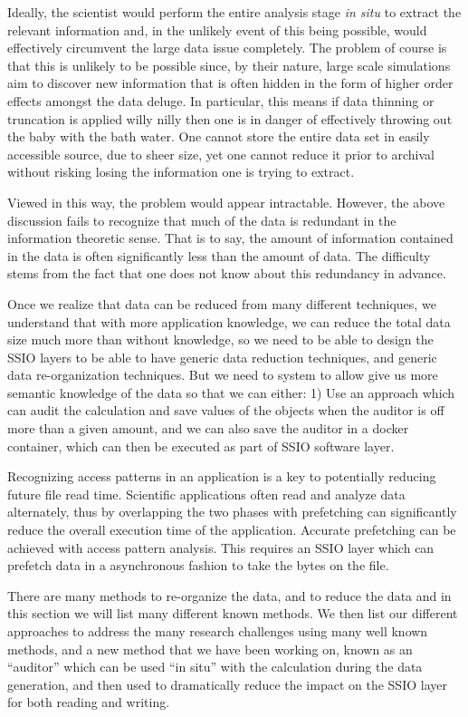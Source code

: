 Ideally, the scientist would perform the entire analysis stage {\em in situ} to
extract the relevant information and, in the unlikely event of this being
possible, would effectively circumvent the large data issue completely.  The
problem of course is that this is unlikely to be possible since, by their
nature, large scale simulations aim to discover new information that is often
hidden in the form of higher order effects amongst the data deluge. In
particular, this means if data thinning or truncation is applied willy nilly
then one is in danger of effectively throwing out the baby with the bath water.
One cannot store the entire data set in easily accessible source, due to sheer
size, yet one cannot reduce it prior to archival without risking losing the
information one is trying to extract.  

Viewed in this way, the problem would appear intractable. However, the above
discussion fails to recognize that much of the data is redundant in the
information theoretic sense.  That is to say, the amount of information
contained in the data is often significantly less than the amount of data.  The
difficulty stems from the fact that one does not know about this redundancy in
advance. 

Once we realize that data can be reduced from many different techniques, we
understand that with more application knowledge, we can reduce the total data
size much more than without knowledge, so we need to be able to design the SSIO
layers to be able to have generic data reduction techniques, and generic data
re-organization techniques. But we need to system to allow give us more
semantic knowledge of the data so that we can either: 1) Use an approach which
can audit the calculation and save values of the objects when the auditor is
off more than a given amount, and we can also save the auditor in a docker
container, which can then be executed as part of SSIO software layer.  

Recognizing access patterns in an application is a key to potentially reducing
future file read time. Scientific applications often read and analyze data
alternately, thus by overlapping the two phases with prefetching can
significantly reduce the overall execution time of the application. Accurate
prefetching can be achieved with access pattern analysis. This requires an SSIO
layer which can prefetch data in a asynchronous fashion to take the bytes on
the file.

There are many methods to re-organize the data, and to reduce the data and in
this section we will list many different known methods.  We then list our
different approaches to address the many research challenges using many well
known methods, and a new method that we have been working on, known as an
``auditor'' which can be used ``in situ'' with the calculation during the data
generation, and then used to dramatically reduce the impact on the SSIO layer
for both reading and writing.


